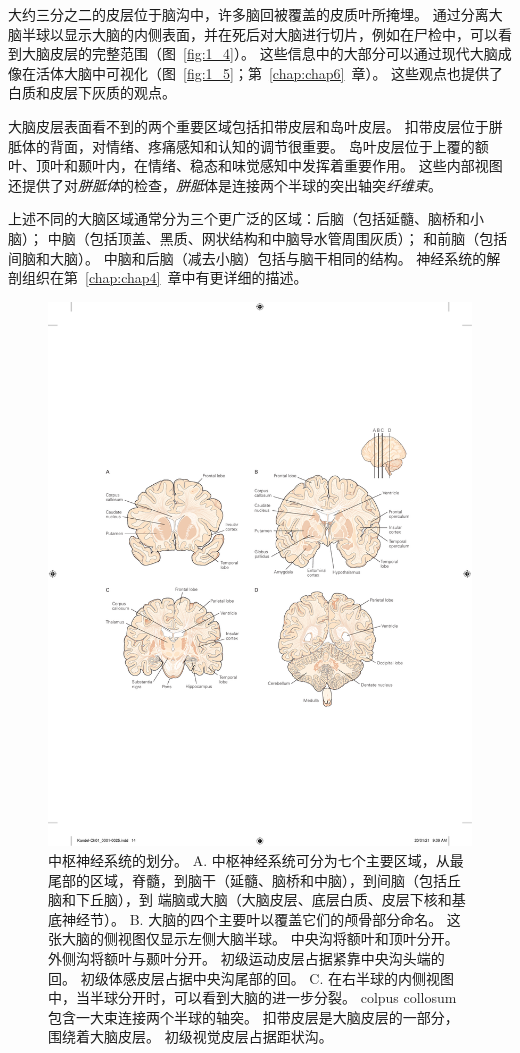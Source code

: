 \begin{proposition}[中枢神经系统的解剖学组织]
	\quad \quad 大约三分之二的皮层位于脑沟中，许多脑回被覆盖的皮质叶所掩埋。
	通过分离大脑半球以显示大脑的内侧表面，并在死后对大脑进行切片，例如在尸检中，可以看到大脑皮层的完整范围（图~\ref{fig:1_4}）。
	这些信息中的大部分可以通过现代大脑成像在活体大脑中可视化（图~\ref{fig:1_5}；第~\ref{chap:chap6}~章）。
	这些观点也提供了白质和皮层下灰质的观点。
	
	\quad \quad 大脑皮层表面看不到的两个重要区域包括扣带皮层和岛叶皮层。
	扣带皮层位于胼胝体的背面，对情绪、疼痛感知和认知的调节很重要。
	岛叶皮层位于上覆的额叶、顶叶和颞叶内，在情绪、稳态和味觉感知中发挥着重要作用。
	这些内部视图还提供了对\textit{胼胝体}的检查，\textit{胼胝}体是连接两个半球的突出轴突\textit{纤维束}。
	
	上述不同的大脑区域通常分为三个更广泛的区域：后脑（包括延髓、脑桥和小脑）；
	中脑（包括顶盖、黑质、网状结构和中脑导水管周围灰质）；
	和前脑（包括间脑和大脑）。
	中脑和后脑（减去小脑）包括与脑干相同的结构。
	神经系统的解剖组织在第~\ref{chap:chap4}~章中有更详细的描述。
		
\end{proposition}


\begin{figure}[htbp]
	\centering
	\includegraphics[width=0.5\linewidth]{chap01/fig_1_4}
	\caption{中枢神经系统的划分。
		A. 中枢神经系统可分为七个主要区域，从最尾部的区域，脊髓，到脑干（延髓、脑桥和中脑），到间脑（包括丘脑和下丘脑），到 端脑或大脑（大脑皮层、底层白质、皮层下核和基底神经节）。
		B. 大脑的四个主要叶以覆盖它们的颅骨部分命名。
		这张大脑的侧视图仅显示左侧大脑半球。 中央沟将额叶和顶叶分开。
		外侧沟将额叶与颞叶分开。
		初级运动皮层占据紧靠中央沟头端的回。
		初级体感皮层占据中央沟尾部的回。
		C. 在右半球的内侧视图中，当半球分开时，可以看到大脑的进一步分裂。
		colpus collosum 包含一大束连接两个半球的轴突。
		扣带皮层是大脑皮层的一部分，围绕着大脑皮层。
		初级视觉皮层占据距状沟。}
	\label{fig:1_3}
\end{figure}


